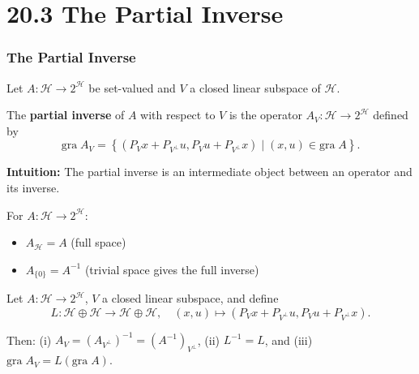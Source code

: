 \documentclass[aspectratio=169,10pt]{beamer}
\newcommand{\gra}{\mathrm{gra}\;}
\newcommand{\set}[1]{\left\{#1\right\}}
\newcommand{\Hilbert}{\mathcal{H}}
\begin{document}

\section{20.3 The Partial Inverse}

\begin{frame}
    \frametitle{The Partial Inverse}

    \begin{definition}[Definition 20.42]
        Let $A : \Hilbert \to 2^{\Hilbert}$ be set-valued and $V$ a closed linear subspace of $\Hilbert$.

        The \textbf{partial inverse} of $A$ with respect to $V$ is the operator
        $A_V : \Hilbert \to 2^{\Hilbert}$ defined by
        \[
            \gra A_V = \set{(P_V x + P_{V^\perp} u, P_V u + P_{V^\perp} x) \mid (x, u) \in \gra A}.
        \]
    \end{definition}

    \vspace{1em}

    \textbf{Intuition:} The partial inverse is an intermediate object between an operator and its inverse.

    \vspace{1em}

    \begin{example}[Example 20.43]
        For $A : \Hilbert \to 2^{\Hilbert}$:
        \begin{itemize}
            \item $A_{\Hilbert} = A$ (full space)
            \item $A_{\{0\}} = A^{-1}$ (trivial space gives the full inverse)
        \end{itemize}
    \end{example}

    \vspace{1em}

    \begin{theorem}
        Let $A : \Hilbert \to 2^{\Hilbert}$, $V$ a closed linear subspace, and define
        \[
            L : \Hilbert \oplus \Hilbert \to \Hilbert \oplus \Hilbert, \quad
            (x, u) \mapsto (P_V x + P_{V^\perp} u, P_V u + P_{V^\perp} x).
        \]

        Then: (i) $A_V = (A_{V^\perp})^{-1} = (A^{-1})_{V^\perp}$,
        (ii) $L^{-1} = L$, and (iii) $\gra A_V = L(\gra A)$.
    \end{theorem}
\end{frame}
\end{document}
